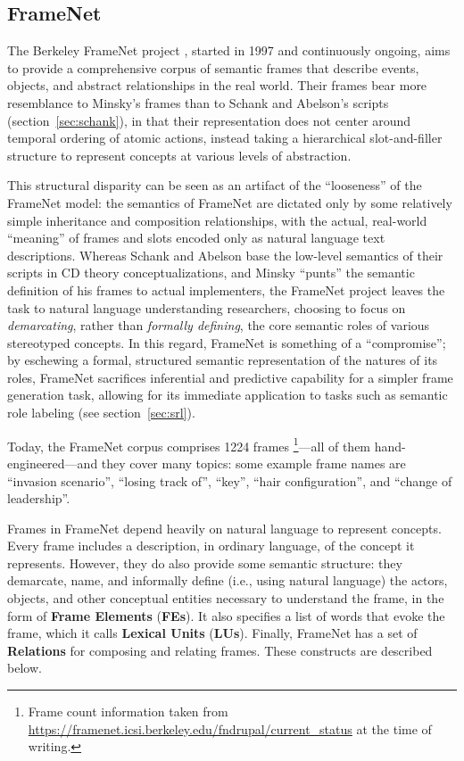 \subsection{FrameNet}
\label{sec:framenet}

The Berkeley FrameNet project \citep{framenet}, started in 1997 and continuously ongoing, aims to provide a comprehensive corpus of semantic frames that describe events, objects, and abstract relationships in the real world.
Their frames bear more resemblance to Minsky's frames
than to Schank and Abelson's scripts (section~\ref{sec:schank}), in that their representation does not center around temporal ordering of atomic actions, instead taking a hierarchical slot-and-filler structure to represent concepts at various levels of abstraction.

This structural disparity can be seen as an artifact of the ``looseness'' of the FrameNet model: the semantics of FrameNet are dictated only by some relatively simple inheritance and composition relationships, with the actual, real-world ``meaning'' of frames and slots encoded only as natural language text descriptions. Whereas Schank and Abelson base the low-level semantics of their scripts in CD theory conceptualizations, and Minsky ``punts'' the semantic definition of his frames to actual implementers, the FrameNet project leaves the task to natural language understanding researchers, choosing to focus on \textit{demarcating}, rather than \textit{formally defining}, the core semantic roles of various stereotyped concepts. In this regard, FrameNet is something of a ``compromise''; by eschewing a formal, structured semantic representation of the natures of its roles, FrameNet sacrifices inferential and predictive capability for a simpler frame generation task, allowing for its immediate application to tasks such as semantic role labeling (see section~\ref{sec:srl}).

Today, the FrameNet corpus comprises 1224 frames \footnote{Frame count information taken from \url{https://framenet.icsi.berkeley.edu/fndrupal/current_status} at the time of writing.}---all of them hand-engineered---and they cover many topics: some example frame names are ``invasion scenario'', ``losing track of'', ``key'', ``hair configuration'', and ``change of leadership''.

Frames in FrameNet depend heavily on natural language to represent concepts. Every frame includes a description, in ordinary language, of the concept it represents. However, they do also provide some semantic structure: they demarcate, name, and informally define (i.e., using natural language) the actors, objects, and other conceptual entities necessary to understand the frame, in the form of \textbf{Frame Elements} (\textbf{FEs}). It also specifies a list of words that evoke the frame, which it calls \textbf{Lexical Units} (\textbf{LUs}). Finally, FrameNet has a set of \textbf{Relations} for composing and relating frames. These constructs are described below.

